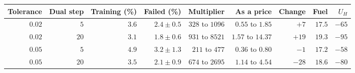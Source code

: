 \begin{tabular}{rrrrrrrrr}
\toprule
Tolerance & Dual step & Training (\%) & Failed (\%) & Multiplier & As a price & Change & Fuel & $U_H$ \\
\midrule
$0.02$ & $5$ & $3.6$ & $2.4\pm0.5$ & $328$ to $1096$ & $0.55$ to $1.85$ & $+7$ & $17.5$ & $-65$ \\
$0.02$ & $20$ & $3.1$ & $1.8\pm0.6$ & $931$ to $8521$ & $1.57$ to $14.37$ & $+19$ & $19.3$ & $-95$ \\
$0.05$ & $5$ & $4.9$ & $3.2\pm1.3$ & $211$ to $477$ & $0.36$ to $0.80$ & $-1$ & $17.2$ & $-58$ \\
$0.05$ & $20$ & $3.5$ & $2.1\pm0.9$ & $674$ to $2695$ & $1.14$ to $4.54$ & $-28$ & $18.6$ & $-80$ \\
\bottomrule
\end{tabular}
